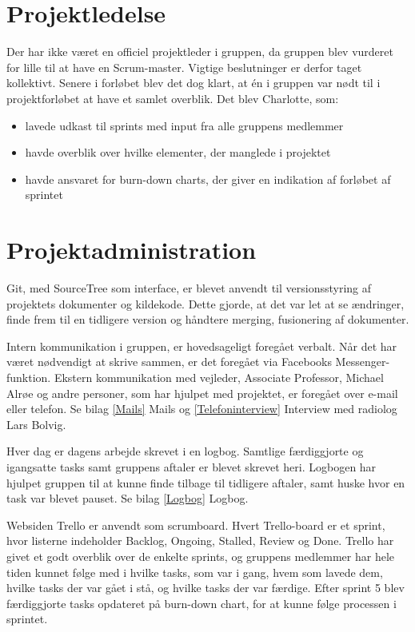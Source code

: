 \section{Projektledelse}
Der har ikke været en officiel projektleder i gruppen, da gruppen blev vurderet for lille til at have en Scrum-master. Vigtige beslutninger er derfor taget kollektivt. Senere i forløbet blev det dog klart, at én i gruppen var nødt til i projektforløbet at have et samlet overblik. Det blev Charlotte, som: 

\let\labelitemi\labelitemii
\begin{itemize}
\item lavede udkast til sprints  med input fra alle gruppens medlemmer
\item havde overblik over hvilke elementer, der manglede i projektet
\item havde ansvaret for burn-down charts, der giver en indikation af forløbet af sprintet
\end{itemize} 

\section{Projektadministration}
Git, med SourceTree som interface, er blevet anvendt til versionsstyring af projektets dokumenter og kildekode. Dette gjorde, at det var let at se ændringer, finde frem til en tidligere version og håndtere merging, fusionering af dokumenter.

Intern kommunikation i gruppen, er hovedsageligt foregået verbalt. Når det har været nødvendigt at skrive sammen, er det foregået via Facebooks Messenger-funktion. Ekstern kommunikation med vejleder, Associate Professor, Michael Alrøe og andre personer, som har hjulpet med projektet, er foregået over e-mail eller telefon. Se bilag \ref{Mails} Mails og \ref{Telefoninterview} Interview med radiolog Lars Bolvig.  

Hver dag er dagens arbejde skrevet i en logbog. Samtlige færdiggjorte og igangsatte tasks samt gruppens aftaler er blevet skrevet heri. Logbogen har hjulpet gruppen til at kunne finde tilbage til tidligere aftaler, samt huske hvor en task var blevet pauset. Se bilag \ref{Logbog} Logbog.  

Websiden Trello er anvendt som scrumboard. Hvert Trello-board er et sprint, hvor listerne indeholder Backlog, Ongoing, Stalled, Review og Done. Trello har givet et godt overblik over de enkelte sprints, og gruppens medlemmer har hele tiden kunnet følge med i hvilke tasks, som var i gang, hvem som lavede dem, hvilke tasks der var gået i stå, og hvilke tasks der var færdige. Efter sprint 5 blev færdiggjorte tasks opdateret på burn-down chart, for at kunne følge processen i sprintet. 

